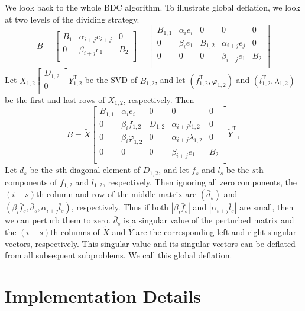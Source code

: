 \documentclass[12pt]{article}
\newcommand{\op}{\operatorname}
\begin{document}
We look back to the whole BDC algorithm. To illustrate global deflation, we look at two levels of the dividing strategy. 
\[
    B = \begin{bmatrix}
        B_1 & \alpha_{i+j} e_{i+j} & 0 \\
        0 & \beta_{i+j} e_1 & B_2 \\
    \end{bmatrix} = \begin{bmatrix}
        B_{1,1} & \alpha_i e_i & 0 & 0 & 0 \\
        0 & \beta_i e_1 & B_{1,2} & \alpha_{i+j} e_j & 0 \\
        0 & 0 & 0 & \beta_{i+j} e_1 & B_2 \\
    \end{bmatrix}
\]
Let \(X_{1,2} \begin{bmatrix}
    D_{1,2} \\
    0 \\
\end{bmatrix} Y_{1,2}^{\op T}\) be the SVD of \(B_{1,2}\), and let \((f_{1,2}^{\op T}, \varphi_{1,2})\) and \((l_{1,2}^{\op T}, \lambda_{1,2})\) be the first and last rows of \(X_{1,2}\), respectively. Then
\[
    B = \tilde{X} \begin{bmatrix}
        B_{1,1} & \alpha_i e_i & 0 & 0 & 0 \\
        0 & \beta_i f_{1,2} & D_{1,2} & \alpha_{i+j} l_{1,2} & 0 \\
        0 & \beta_i \varphi_{1,2} & 0 & \alpha_{i+j} \lambda_{1,2} & 0 \\
        0 & 0 & 0 & \beta_{i+j} e_1 & B_2 \\
    \end{bmatrix} \tilde{Y}^{\op T},
\]
Let $\bar{d}_s$ be the $s$th diagonal element of $D_{1,2}$, and let $\bar{f}_s$ and $\bar{l}_s$ be the $s$th components of $f_{1,2}$ and $l_{1,2}$, respectively. Then ignoring all zero components, the $(i+s)$th column and row of the middle matrix are $(\bar{d}_s)$ and $(\beta_i\bar{f}_s, \bar{d}_s, \alpha_{i+j}\bar{l}_s)$, respectively. Thus if both $|\beta_i\bar{f}_s|$ and $|\alpha_{i+j}\bar{l}_s|$ are small, then we can perturb them to zero. $\bar{d}_s$ is a singular value of the perturbed matrix and the $(i+s)$th columns of $\tilde{X}$ and $\tilde{Y}$ are the corresponding left and right singular vectors, respectively. This singular value and its singular vectors can be deflated from all subsequent subproblems. We call this global deflation.

\section{Implementation Details}
\end{document}
